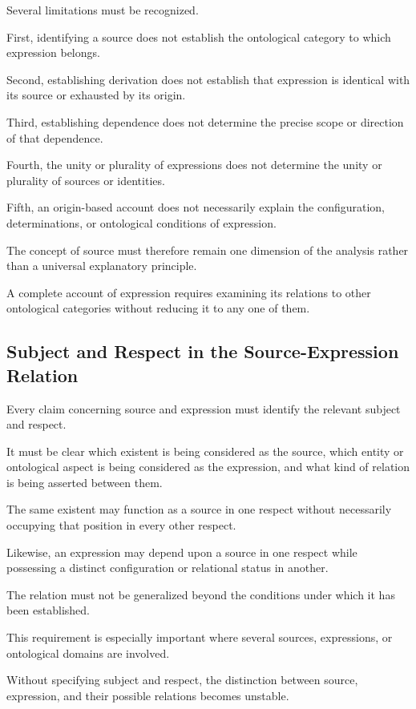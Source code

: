Several limitations must be recognized.

First, identifying a source does not establish
the ontological category to which expression belongs.

Second, establishing derivation does not establish
that expression is identical with its source
or exhausted by its origin.

Third, establishing dependence does not determine
the precise scope or direction of that dependence.

Fourth, the unity or plurality of expressions
does not determine the unity or plurality
of sources or identities.

Fifth, an origin-based account does not necessarily
explain the configuration, determinations,
or ontological conditions of expression.

The concept of source must therefore remain
one dimension of the analysis rather than
a universal explanatory principle.

A complete account of expression requires
examining its relations to other ontological
categories without reducing it to any one
of them.

\subsection{Subject and Respect in the Source-Expression Relation}

Every claim concerning source and expression
must identify the relevant subject and respect.

It must be clear which existent is being
considered as the source, which entity or
ontological aspect is being considered as
the expression, and what kind of relation
is being asserted between them.

The same existent may function as a source
in one respect without necessarily occupying
that position in every other respect.

Likewise, an expression may depend upon
a source in one respect while possessing
a distinct configuration or relational status
in another.

The relation must not be generalized beyond
the conditions under which it has been established.

This requirement is especially important
where several sources, expressions, or
ontological domains are involved.

Without specifying subject and respect,
the distinction between source, expression,
and their possible relations becomes unstable.

